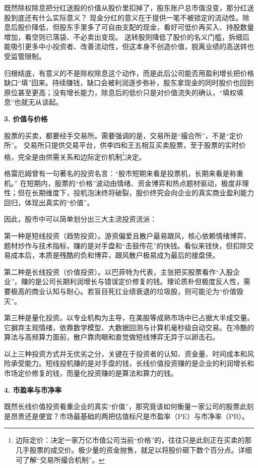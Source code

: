\documentclass[12pt,openany]{book}
\newcommand{\subhead}[1]{%
    \par\vspace{0.5\baselineskip}%
    \noindent\textbf{#1}\par%
    \vspace{0.5\baselineskip}%
}
\begin{document}
既然除权除息把分红送股的价值从股价里扣掉了，股东账户总市值没变，那分红送股到底还有什么实际意义？
现金分红的意义在于提供一笔不被锁定的流动性。除息后股价降低，但股东手里多了可自由支配的现金，看好可低价再买入、持股数量增加，看空则已落袋、不必卖出变现。
送转股则降低了股价的名义门槛，拆细后能吸引更多中小投资者、改善流动性，但这本身不创造价值，脱离业绩的高送转也受监管限制。

归根结底，有意义的不是除权除息这个动作，而是此后公司能否用盈利增长把价格缺口“填”回来。持续赚钱，缺口会被利润逐步弥补，股东拿现金的同时股价也回到原位甚至更高；没有增长能力，除息后的低价只是对价值流失的确认，“填权填息”也就无从谈起。

\subhead{3. 价值与价格}

股票的买卖，都要经手交易所。需要强调的是，交易所是“撮合所”，不是“定价所”。
交易所只提供交易平台，供李四和王五相互买卖股票，至于股票的实时价格，完全是由供需关系和边际定价机制\footnote{边际定价：决定一家万亿市值公司当前“价格”的，往往只是此刻正在买卖的那几手股票的成交价。极少量的资金抛售，就足以将股价砸下数个百分点。详细可了解“交易所撮合机制”。}决定。

格雷厄姆曾有一句著名的投资名言：“股市短期来看是投票机，长期来看是称重机。”
在短期内，股票的“价格”波动由情绪、资金博弈和热点题材驱动，极度非理性；但在长期维度下，投机泡沫终将破裂，股价终究会向企业的真实商业盈利能力回归，体现出真实的“价值”。

因此，股市中可以简单划分出三大主流投资流派：

第一种是短线投资（趋势投资）。游资偏爱且散户最易跟风，核心依赖情绪博弈、题材炒作与技术指标，赚的是对手盘和“击鼓传花”的快钱。看似来钱快，但扣除交易成本后，本质是残酷的负和博弈，跟风散户极易成为最后的接盘侠。

第二种是长线投资（价值投资）。以巴菲特为代表，主张把买股票看作“入股企业”，赚的是公司长期利润增长与错误定价修复的钱。理论质朴但极度反人性，需要极高的商业认知与耐心。若盲目死扛业绩衰退的垃圾股，则可能沦为“价值毁灭”。

第三种是量化投资。以专业机构为主导，在美股等成熟市场中已占据大半成交量。它摒弃主观情绪，依靠数学模型、大数据回测与计算机毫秒级自动交易。在冷酷的算法与高频算力面前，散户靠肉眼和直觉做短线博弈无异于以卵击石。

以上三种投资方式并无优劣之分，关键在于投资者的认知、资金量、时间成本和风险承受能力。短线投机赚的是对手盘的钱，长线价值投资赚的是企业的利润增长和市场定价修复的钱，而量化投资赚的是算法和算力的钱。

\subhead{4. 市盈率与市净率}

既然长线价值投资看重企业的真实“价值”，那究竟该如何衡量一家公司的股票此刻是昂贵还是便宜？市场最基础的两把估值标尺是市盈率（PE）与市净率（PB）。
\end{document}
